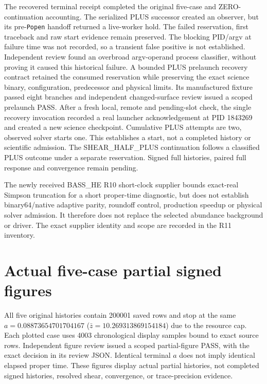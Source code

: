 \documentclass[11pt]{article}
\begin{document}
The recovered terminal receipt completed the original five-case and ZERO-continuation accounting. The serialized PLUS successor created an observer, but its pre-\texttt{Popen} handoff returned a live-worker hold. The failed reservation, first traceback and raw start evidence remain preserved. The blocking PID/argv at failure time was not recorded, so a transient false positive is not established. Independent review found an overbroad argv-operand process classifier, without proving it caused this historical failure. A bounded PLUS prelaunch recovery contract retained the consumed reservation while preserving the exact science binary, configuration, predecessor and physical limits. Its manufactured fixture passed eight branches and independent changed-surface review issued a scoped prelaunch PASS. After a fresh local, remote and pending-slot check, the single recovery invocation recorded a real launcher acknowledgement at PID 1843269 and created a new science checkpoint. Cumulative PLUS attempts are two, observed solver starts one. This establishes a start, not a completed history or scientific admission. The SHEAR\_HALF\_PLUS continuation follows a classified PLUS outcome under a separate reservation. Signed full histories, paired full response and convergence remain pending.

The newly received BASS\_HE R10 short-clock supplier bounds exact-real Simpson truncation for a short proper-time diagnostic, but does not establish binary64/native adaptive parity, roundoff control, production speedup or physical solver admission. It therefore does not replace the selected abundance background or driver. The exact supplier identity and scope are recorded in the R11 inventory.

\section{Actual five-case partial signed figures}
All five original histories contain 200001 saved rows and stop at the same $a=0.08873654701704167$ ($\bar z=10.269313869154184$) due to the resource cap. Each plotted case uses 4003 chronological display samples bound to exact source rows. Independent figure review issued a scoped partial-figure PASS, with the exact decision in its review JSON. Identical terminal $a$ does not imply identical elapsed proper time. These figures display actual partial histories, not completed signed histories, resolved shear, convergence, or trace-precision evidence.
\end{document}
